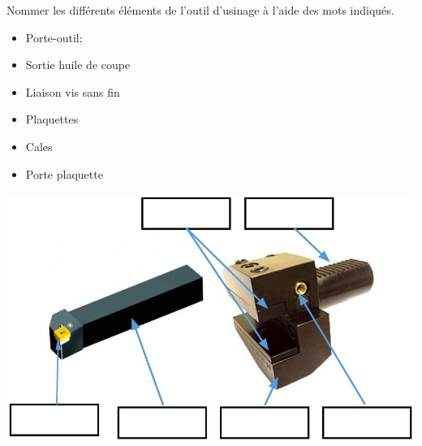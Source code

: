 \documentclass[12pt,a4paper]{article} %
\begin{document}

\newpage

\begin{exo} Nommer les différents  éléments de l’outil d’usinage à l'aide des mots
indiqués. \end{exo}
\begin{minipage}{.55\linewidth}
\begin{itemize}
    \item Porte-outil;
    \item Sortie huile de coupe
    \item Liaison vis sans fin
\end{itemize} 
\end{minipage}
\begin{minipage}{.44\linewidth}
\begin{itemize}
    \item Plaquettes
    \item Cales
    \item Porte plaquette
\end{itemize} 
\end{minipage}
\includegraphics[scale=0.65]{PP1.JPG}
\end{document}
